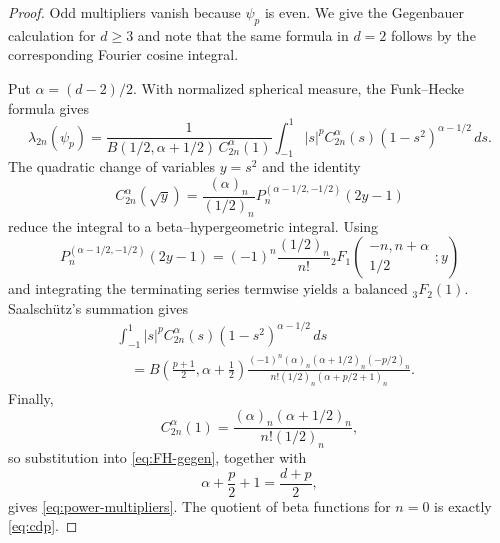 \documentclass[10pt,a4paper]{amsart}
\begin{document}
\begin{proof}
Odd multipliers vanish because $\psi_p$ is even.  We give the Gegenbauer calculation for $d\ge3$ and note that the same formula in $d=2$ follows by the corresponding Fourier cosine integral.

Put $\alpha=(d-2)/2$.  With normalized spherical measure, the Funk--Hecke formula gives
\begin{equation}\label{eq:FH-gegen}
 \lambda_{2n}(\psi_p)
 =\frac{1}{B(1/2,\alpha+1/2)\,C_{2n}^{\alpha}(1)}
 \int_{-1}^1|s|^pC_{2n}^{\alpha}(s)(1-s^2)^{\alpha-1/2}\,ds.
\end{equation}
The quadratic change of variables $y=s^2$ and the identity
\begin{equation}\label{eq:gegen-jacobi}
 C_{2n}^{\alpha}(\sqrt y)
 =\frac{(\alpha)_n}{(1/2)_n}
 P_n^{(\alpha-1/2,-1/2)}(2y-1)
\end{equation}
reduce the integral to a beta--hypergeometric integral.  Using
\[
 P_n^{(\alpha-1/2,-1/2)}(2y-1)
 =(-1)^n\frac{(1/2)_n}{n!}
 {}_2F_1\!\left(\begin{matrix}-n,n+\alpha\\[1mm]1/2\end{matrix};y\right)
\]
and integrating the terminating series termwise yields a balanced ${}_3F_2(1)$.  Saalsch\"utz's summation gives
\begin{align}\label{eq:gegen-integral}
 &\int_{-1}^1|s|^pC_{2n}^{\alpha}(s)(1-s^2)^{\alpha-1/2}\,ds\\
 &\quad=
 B\!\left(\frac{p+1}{2},\alpha+\frac12\right)
 \frac{(-1)^n(\alpha)_n(\alpha+1/2)_n(-p/2)_n}
 {n!(1/2)_n(\alpha+p/2+1)_n}.
\end{align}
Finally,
\[
 C_{2n}^{\alpha}(1)
 =\frac{(\alpha)_n(\alpha+1/2)_n}{n!(1/2)_n},
\]
so substitution into \eqref{eq:FH-gegen}, together with
\[
 \alpha+\frac p2+1=\frac{d+p}{2},
\]
gives \eqref{eq:power-multipliers}.  The quotient of beta functions for $n=0$ is exactly \eqref{eq:cdp}.
\end{proof}
\end{document}
